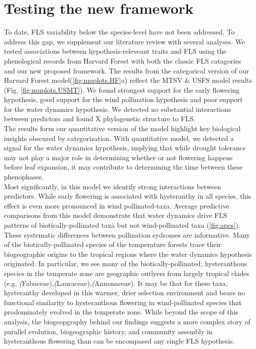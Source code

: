 \documentclass{article}
\begin{document}
{\section*{Testing the new framework}

To date, FLS variability below the species-level have not been addressed. To address this gap, we supplement our literature review with several analyses. We tested associations between hypothesis-releveant traits and FLS using the phenological records from Harvard Forest with both the classic FLS catagories and our new proposed framework. The results from the categorical version of our Harvard Forest model(\ref{fig:muplots.HF}a) reflect the MTSV & USFS model results (Fig. \ref{fig:muplots.USMT}). We found strongest support for the early flowering hypothesis, good support for the wind pollination hypothesis and poor support for the water dynamics hypothesis. We detected no substantial interactions between predictors and found X phylogenetic structure to FLS. \\

\noindent The results form our quantitative version of the model highlight key biological insights obscured by categorization. With quantitative model, we detected a signal for the water dynamics hypothesis, implying that while drought tolerance may not play a major role in determining whether or not flowering happens before leaf expansion, it may contribute to determining the time between these phenophases.\\

\noindent Most significantly, in this model we identify strong interactions between predictors. While early flowering is associated with hysteranthy in all species, this effect is even more pronounced in wind pollinated-taxa. Average predictive comparisons from this model demonstrate that water dynamics drive FLS patterns of biotically-pollinated taxa but not wind-pollinated taxa (\ref{fig:apcs}). These systematic differences between pollination sydromes are informative. Many of the biotically-pollinated species of the temperature forests trace their biogeographic origins to the tropical regions \citep{Daubenmire1972} where the water dynamics hypothesis originated\citep{Janzen1967,Franklin2016}. In particular, we see many of the biotically-pollinated, hysteranthous species in the temperate zone are geographic outlyers from largely tropical clades (e.g. \textit(Fabaceae),\textit(Lauraceae),\textit(Annonaceae). It may be that for these taxa, hysteranthy developed in this warmer, drier selection environment and bears no functional similarity to hysteranthous flowering in wind-pollinated species that prodominately evolved in the temperate zone. While beyond the scope of this analysis, the biogeopgraphy behind our findings suggests a more complex story of parallel evolution, biogeographic history, and community assembly in hysteranthous flowering than can be encompased any single FLS hypothesis.\\

}
\end{document}
